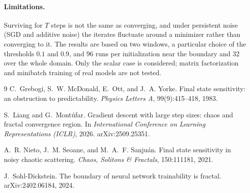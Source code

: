 \documentclass[11pt]{article}
\begin{document}
\paragraph{Limitations.} Surviving for $T$ steps is not the same as converging, and under persistent noise (SGD and additive noise) the iterates fluctuate around a minimizer rather than converging to it. The results are based on two windows, a particular choice of the thresholds $0.1$ and $0.9$, and $96$ runs per initialization near the boundary and $32$ over the whole domain. Only the scalar case is considered; matrix factorization and minibatch training of real models are not tested.

\begin{thebibliography}{9}
C.~Grebogi, S.~W. McDonald, E.~Ott, and J.~A. Yorke.
\newblock Final state sensitivity: an obstruction to predictability.
\newblock \emph{Physics Letters A}, 99(9):415--418, 1983.

S.~Liang and G.~Mont\'ufar.
\newblock Gradient descent with large step sizes: chaos and fractal convergence region.
\newblock In \emph{International Conference on Learning Representations (ICLR)}, 2026.
\newblock arXiv:2509.25351.

A.~R. Nieto, J.~M. Seoane, and M.~A.~F. Sanju\'an.
\newblock Final state sensitivity in noisy chaotic scattering.
\newblock \emph{Chaos, Solitons \& Fractals}, 150:111181, 2021.

J.~Sohl-Dickstein.
\newblock The boundary of neural network trainability is fractal.
\newblock arXiv:2402.06184, 2024.
\end{thebibliography}
\end{document}
